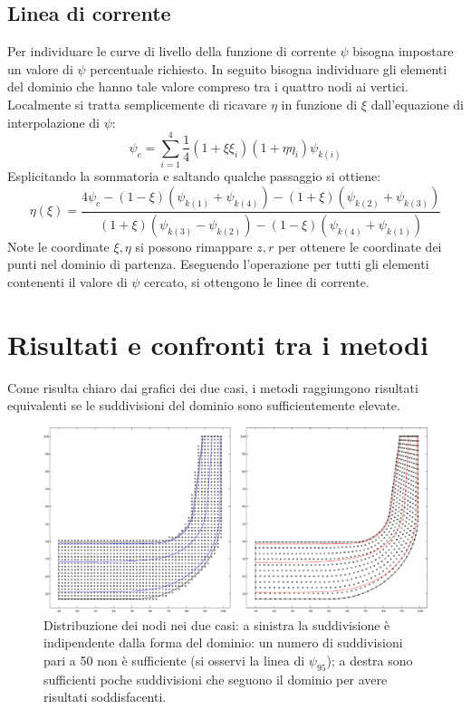 \documentclass{tufte-handout}
\begin{document}
\subsection{Linea di corrente}
Per individuare le curve di livello della funzione di corrente $\psi$ bisogna impostare un valore di $\psi$ percentuale richiesto. In seguito bisogna individuare gli elementi del dominio che hanno tale valore compreso tra i quattro nodi ai vertici. Localmente si tratta semplicemente di ricavare $\eta$ in funzione di $\xi$ dall'equazione di interpolazione di $\psi$:
\begin{equation*}
    \psi_c = \sum_{i=1}^4 \frac{1}{4} (1+\xi \xi_i)(1+\eta \eta_i) \psi_{k(i)}
\end{equation*}
Esplicitando la sommatoria e saltando qualche passaggio si ottiene:
\begin{equation}
    \eta(\xi) = \frac{4 \psi_c - (1-\xi)(\psi_{k(1)}+\psi_{k(4)}) -(1+\xi)(\psi_{k(2)}+\psi_{k(3)})}
    {(1+\xi)(\psi_{k(3)}-\psi_{k(2)}) -(1-\xi)(\psi_{k(4)}+\psi_{k(1)})}
\end{equation}
Note le coordinate $\xi, \eta$ si possono rimappare $z, r$ per ottenere le coordinate dei punti nel dominio di partenza. Eseguendo l'operazione per tutti gli elementi contenenti il valore di $\psi$ cercato, si ottengono le linee di corrente.

\section{Risultati e confronti tra i metodi}
Come risulta chiaro dai grafici dei due casi, i metodi raggiungono risultati equivalenti se le suddivisioni del dominio sono sufficientemente elevate.

\begin{figure}
    \centering
    \includegraphics{fem_fdm_mesh.eps}
    \caption{Distribuzione dei nodi nei due casi: a sinistra la suddivisione è indipendente dalla forma del dominio: un numero di suddivisioni pari a 50 non è sufficiente (si osservi la linea di $\psi_{95}$); a destra  sono sufficienti poche suddivisioni che seguono il dominio per avere risultati soddisfacenti.}
    \label{fig:mesh}
\end{figure}
\end{document}
